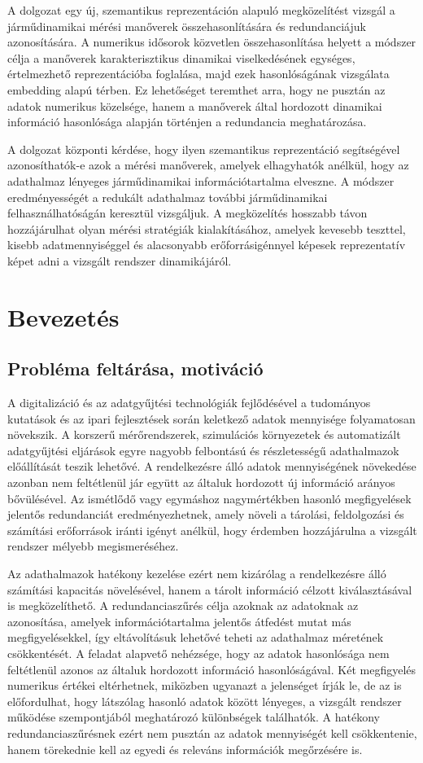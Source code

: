 \documentclass[12pt,a4paper,onehalfspacing, oneside]{book} %
\begin{document}
A dolgozat egy új, szemantikus reprezentáción alapuló megközelítést vizsgál a járműdinamikai mérési manőverek összehasonlítására és redundanciájuk azonosítására. A numerikus idősorok közvetlen összehasonlítása helyett a módszer célja a manőverek karakterisztikus dinamikai viselkedésének egységes, értelmezhető reprezentációba foglalása, majd ezek hasonlóságának vizsgálata embedding alapú térben. Ez lehetőséget teremthet arra, hogy ne pusztán az adatok numerikus közelsége, hanem a manőverek által hordozott dinamikai információ hasonlósága alapján történjen a redundancia meghatározása.

A dolgozat központi kérdése, hogy ilyen szemantikus reprezentáció segítségével azonosíthatók-e azok a mérési manőverek, amelyek elhagyhatók anélkül, hogy az adathalmaz lényeges járműdinamikai információtartalma elveszne. A módszer eredményességét a redukált adathalmaz további járműdinamikai felhasználhatóságán keresztül vizsgáljuk. A megközelítés hosszabb távon hozzájárulhat olyan mérési stratégiák kialakításához, amelyek kevesebb teszttel, kisebb adatmennyiséggel és alacsonyabb erőforrásigénnyel képesek reprezentatív képet adni a vizsgált rendszer dinamikájáról.

\chapter{Bevezetés}\label{ch:bevezetes}
\section{Probléma feltárása, motiváció}
A digitalizáció és az adatgyűjtési technológiák fejlődésével a tudományos kutatások és az ipari fejlesztések során keletkező adatok mennyisége folyamatosan növekszik. A korszerű mérőrendszerek, szimulációs környezetek és automatizált adatgyűjtési eljárások egyre nagyobb felbontású és részletességű adathalmazok előállítását teszik lehetővé. A rendelkezésre álló adatok mennyiségének növekedése azonban nem feltétlenül jár együtt az általuk hordozott új információ arányos bővülésével. Az ismétlődő vagy egymáshoz nagymértékben hasonló megfigyelések jelentős redundanciát eredményezhetnek, amely növeli a tárolási, feldolgozási és számítási erőforrások iránti igényt anélkül, hogy érdemben hozzájárulna a vizsgált rendszer mélyebb megismeréséhez.

Az adathalmazok hatékony kezelése ezért nem kizárólag a rendelkezésre álló számítási kapacitás növelésével, hanem a tárolt információ célzott kiválasztásával is megközelíthető. A redundanciaszűrés célja azoknak az adatoknak az azonosítása, amelyek információtartalma jelentős átfedést mutat más megfigyelésekkel, így eltávolításuk lehetővé teheti az adathalmaz méretének csökkentését. A feladat alapvető nehézsége, hogy az adatok hasonlósága nem feltétlenül azonos az általuk hordozott információ hasonlóságával. Két megfigyelés numerikus értékei eltérhetnek, miközben ugyanazt a jelenséget írják le, de az is előfordulhat, hogy látszólag hasonló adatok között lényeges, a vizsgált rendszer működése szempontjából meghatározó különbségek találhatók. A hatékony redundanciaszűrésnek ezért nem pusztán az adatok mennyiségét kell csökkentenie, hanem törekednie kell az egyedi és releváns információk megőrzésére is.
\end{document}
